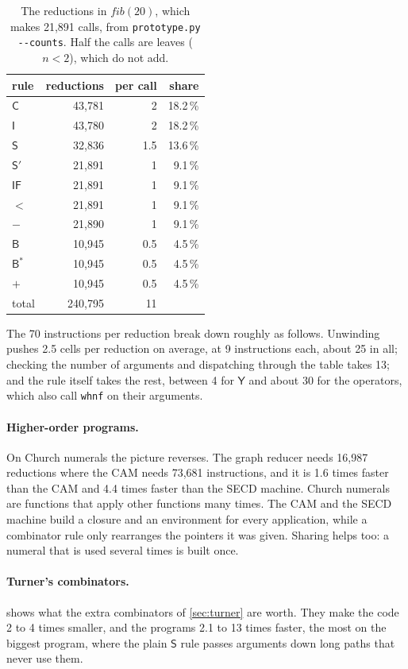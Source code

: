 \documentclass[11pt,a4paper]{article}
\newcommand{\cmb}[1]{\textsf{#1}}
\newcommand{\I}{\cmb{I}}
\newcommand{\Sc}{\cmb{S}}
\newcommand{\B}{\cmb{B}}
\newcommand{\C}{\cmb{C}}
\newcommand{\Sp}{\cmb{S}'}
\newcommand{\Bs}{\cmb{B}^{*}}
\newcommand{\Y}{\cmb{Y}}
\newcommand{\IF}{\cmb{IF}}
\theoremstyle{definition}
\theoremstyle{plain}
\begin{document}
\begin{table}[t]
\centering
\small
\begin{tabular}{@{}l r r r@{}}
\toprule
rule & reductions & per call & share\\
\midrule
$\C$ & 43,781 & 2 & 18.2\,\%\\
$\I$ & 43,780 & 2 & 18.2\,\%\\
$\Sc$ & 32,836 & 1.5 & 13.6\,\%\\
$\Sp$ & 21,891 & 1 & 9.1\,\%\\
$\IF$ & 21,891 & 1 & 9.1\,\%\\
${<}$ & 21,891 & 1 & 9.1\,\%\\
${-}$ & 21,890 & 1 & 9.1\,\%\\
$\B$ & 10,945 & 0.5 & 4.5\,\%\\
$\Bs$ & 10,945 & 0.5 & 4.5\,\%\\
${+}$ & 10,945 & 0.5 & 4.5\,\%\\
\midrule
total & 240,795 & 11 & \\
\bottomrule
\end{tabular}
\caption{The reductions in $\mathit{fib}(20)$, which makes 21,891 calls,
from \texttt{prototype.py -{}-counts}. Half the calls are leaves ($n < 2$),
which do not add.}
\label{tab:mix}
\end{table}

The 70 instructions per reduction break down roughly as follows. Unwinding
pushes 2.5 cells per reduction on average, at 9 instructions each, about 25
in all; checking the number of arguments and dispatching through the table
takes 13; and the rule itself takes the rest, between 4 for $\Y$ and about
30 for the operators, which also call \texttt{whnf} on their arguments.

\paragraph{Higher-order programs.} On Church numerals the picture reverses.
The graph reducer needs 16,987 reductions where the CAM needs 73,681
instructions, and it is 1.6 times faster than the CAM and 4.4 times faster
than the SECD machine. Church numerals are functions that apply other
functions many times. The CAM and the SECD machine build a closure and an
environment for every application, while a combinator rule only rearranges
the pointers it was given. Sharing helps too: a numeral that is used several
times is built once.

\paragraph{Turner's combinators.}  shows what the extra
combinators of \cref{sec:turner} are worth. They make the code 2 to 4
times smaller, and the programs 2.1 to 13 times faster, the most on the
biggest program, where the plain $\Sc$ rule passes arguments down long paths
that never use them.
\end{document}
